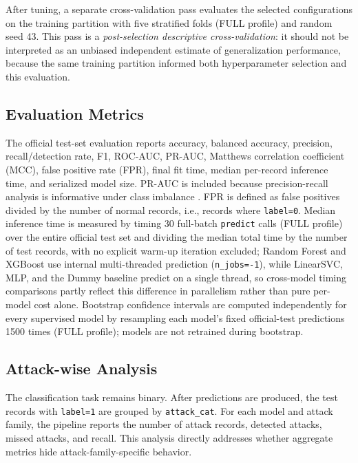 \documentclass[conference]{IEEEtran}
\begin{document}
After tuning, a separate cross-validation pass evaluates the selected configurations on the training partition with five stratified folds (FULL profile) and random seed 43. This pass is a \emph{post-selection descriptive cross-validation}: it should not be interpreted as an unbiased independent estimate of generalization performance, because the same training partition informed both hyperparameter selection and this evaluation.

\subsection{Evaluation Metrics}
The official test-set evaluation reports accuracy, balanced accuracy, precision, recall/detection rate, F1, ROC-AUC, PR-AUC, Matthews correlation coefficient (MCC), false positive rate (FPR), final fit time, median per-record inference time, and serialized model size. PR-AUC is included because precision-recall analysis is informative under class imbalance \cite{davis2006pr}. FPR is defined as false positives divided by the number of normal records, i.e., records where \texttt{label=0}. Median inference time is measured by timing 30 full-batch \texttt{predict} calls (FULL profile) over the entire official test set and dividing the median total time by the number of test records, with no explicit warm-up iteration excluded; Random Forest and XGBoost use internal multi-threaded prediction (\texttt{n\_jobs=-1}), while LinearSVC, MLP, and the Dummy baseline predict on a single thread, so cross-model timing comparisons partly reflect this difference in parallelism rather than pure per-model cost alone. Bootstrap confidence intervals are computed independently for every supervised model by resampling each model's fixed official-test predictions 1500 times (FULL profile); models are not retrained during bootstrap.

\subsection{Attack-wise Analysis}
The classification task remains binary. After predictions are produced, the test records with \texttt{label=1} are grouped by \texttt{attack\_cat}. For each model and attack family, the pipeline reports the number of attack records, detected attacks, missed attacks, and recall. This analysis directly addresses whether aggregate metrics hide attack-family-specific behavior.
\end{document}
